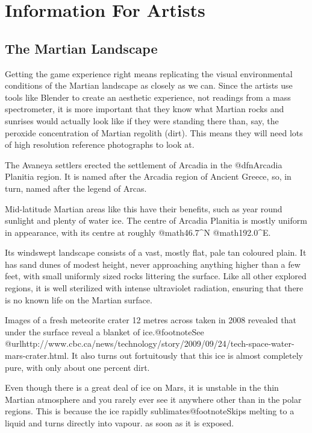 \chapter{Information For Artists}

\section{The Martian Landscape}

Getting the game experience right means replicating the visual environmental conditions of the Martian landscape as closely as we can. Since the artists use tools like Blender to create an aesthetic experience, not readings from a mass spectrometer, it is more important that they know what Martian rocks and sunrises would actually look like if they were standing there than, say, the peroxide concentration of Martian regolith (dirt). This means they will need lots of high resolution reference photographs to look at.

The Avaneya settlers erected the settlement of Arcadia in the @dfn{Arcadia Planitia} region. It is named after the Arcadia region of Ancient Greece, so, in turn, named after the legend of Arcas. 

Mid-latitude Martian areas like this have their benefits, such as year round sunlight and plenty of water ice. The centre of Arcadia Planitia is mostly uniform in appearance, with its centre at roughly @math{46.7^{\circ}}N @math{192.0^{\circ}}E.

Its windswept landscape consists of a vast, mostly flat, pale tan coloured plain. It has sand dunes of modest height, never approaching anything higher than a few feet, with small uniformly sized rocks littering the surface. Like all other explored regions, it is well sterilized with intense ultraviolet radiation, ensuring that there is no known life on the Martian surface.

Images of a fresh meteorite crater 12 metres across taken in 2008 revealed that under the surface reveal a blanket of ice.@footnote{See @url{http://www.cbc.ca/news/technology/story/2009/09/24/tech-space-water-mars-crater.html}.} It also turns out fortuitously that this ice is almost completely pure, with only about one percent dirt.

Even though there is a great deal of ice on Mars, it is unstable in the thin Martian atmosphere and you rarely ever see it anywhere other than in the polar regions. This is because the ice rapidly sublimates@footnote{Skips melting to a liquid and turns directly into vapour.} as soon as it is exposed.

